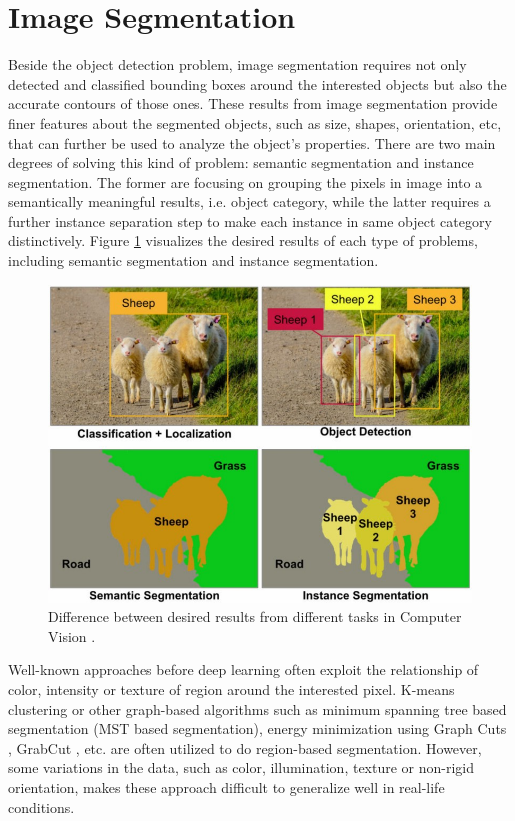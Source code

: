 \section{Image Segmentation}

Beside the object detection problem, image segmentation requires not only detected and classified bounding boxes around the interested objects but also the accurate contours of those ones. These results from image segmentation provide finer features about the segmented objects, such as size, shapes, orientation, etc, that can further be used to analyze the object's properties. There are two main degrees of solving this kind of problem: semantic segmentation and instance segmentation. The former are focusing on grouping the pixels in image into a semantically meaningful results, i.e. object category, while the latter requires a further instance separation step to make each instance in same object category distinctively. Figure \ref{fig:3_object_vs_instance} visualizes the desired results of each type of problems, including semantic segmentation and instance segmentation.

\begin{figure}[thb]
    \centering
    \includegraphics[width=\textwidth]{resources/3_object_vs_instance.jpeg}
    \caption{Difference between desired results from different tasks in Computer Vision \cite{instace_vs_object}.}
    \label{fig:3_object_vs_instance}
\end{figure}

Well-known approaches before deep learning often exploit the relationship of color, intensity or texture of region around the interested pixel. K-means clustering \cite{kmean} or other graph-based algorithms such as minimum spanning tree based segmentation (MST based segmentation), energy minimization using Graph Cuts \cite{FastGraphCuts, EfficientGraphBasedSegmentation}, GrabCut \cite{GrabCut}, etc. are often utilized to do region-based segmentation. However, some variations in the data, such as color, illumination, texture or non-rigid orientation, makes these approach difficult to generalize well in real-life conditions. 

